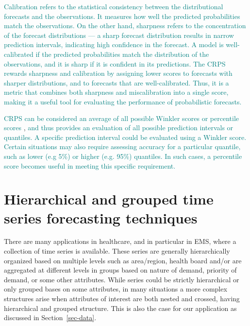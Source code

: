\documentclass[
  authoryear,
  preprint,
  3p]{elsarticle}
\begin{document}
\textcolor{teal}{Calibration refers to the statistical consistency between the distributional forecasts and the observations. It measures how well the predicted probabilities match the observations. On the other hand, sharpness refers to the concentration of the forecast distributions --- a sharp forecast distribution results in narrow prediction intervals, indicating high confidence in the forecast. A model is well-calibrated if the predicted probabilities match the distribution of the observations, and it is sharp if it is confident in its predictions. The CRPS rewards sharpness and calibration by assigning lower scores to forecasts with sharper distributions, and to forecasts that are well-calibrated. Thus, it is a metric that combines both sharpness and miscalibration into a single score, making it a useful tool for evaluating the performance of probabilistic forecasts.}

\textcolor{teal}{CRPS can be considered an average of all possible Winkler scores}
\citep[Section 5.9]{winkler1972decision, hyndman2021forecasting}
\textcolor{teal}{or percentile scores} \citep[Section
5.9]{hyndman2021forecasting},
\textcolor{teal}{and thus provides an evaluation of all possible prediction intervals or quantiles.}
\textcolor{teal}{A specific prediction interval could be evaluated using a Winkler score. Certain situations may also require assessing accuracy for a particular quantile, such as lower (e.g 5\%) or higher (e.g. 95\%) quantiles. In such cases, a percentile score becomes useful in meeting this specific requirement.}

\hypertarget{sec-htc}{%
\section{Hierarchical and grouped time series forecasting
techniques}\label{sec-htc}}

There are many applications in healthcare, and in particular in EMS,
where a collection of time series is available. These series are
generally hierarchically organized based on multiple levels such as
area/region, health board and/or are aggregated at different levels in
groups based on nature of demand, priority of demand, or some other
attributes. While series could be strictly hierarchical or only grouped
bases on some attributes, in many situations a more complex structures
arise when attributes of interest are both nested and crossed, having
hierarchical and grouped structure. This is also the case for our
application as discussed in Section~\ref{sec-data}.
\end{document}
